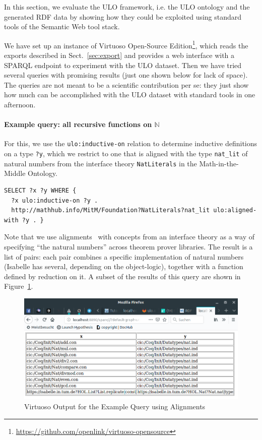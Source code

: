 
In this section, we evaluate the ULO framework, i.e. the ULO ontology and the generated RDF data by showing how they could be exploited using standard tools of the Semantic Web tool stack.

We have set up an instance of Virtuoso Open-Source Edition\footnote{\url{https://github.com/openlink/virtuoso-opensource}}, which reads the exports described in Sect.~\ref{sec:export} and provides a web interface with a SPARQL endpoint to experiment with the ULO dataset.
Then we have tried several queries with promising results (just one shown below for lack of space).
The queries are not meant to be a scientific contribution per se: they just show how much can be accomplished with the ULO dataset with standard tools in one afternoon.

\paragraph{Example query: all recursive functions on $\mathbb{N}$} For this, we use the \lstinline|ulo:inductive-on| relation to determine inductive definitions on a type \lstinline|?y|, which we restrict to one that is aligned with the type \lstinline|nat_lit| of natural numbers from the interface theory \lstinline|NatLiterals| in the Math-in-the-Middle Ontology.
\begin{lstlisting}
SELECT ?x ?y WHERE {
  ?x ulo:inductive-on ?y .
  http://mathhub.info/MitM/Foundation?NatLiterals?nat_lit ulo:aligned-with ?y . }
\end{lstlisting}
Note that we use alignments~\cite{MueGauKal:cacfms17} with concepts from an interface theory as a way of specifying ``the natural numbers'' across theorem prover libraries. The result is a list of pairs: each pair combines a specific implementation of natural numbers (Isabelle has several, depending on the object-logic), together with a function defined by reduction on it. A subset of the results of this query are shown in Figure~\ref{fig:query}.

\begin{figure}[t]\centering
\includegraphics[width=\textwidth]{ulo_queryresult}
\caption{Virtuoso Output for the Example Query using Alignments}\label{fig:query}
\end{figure}

